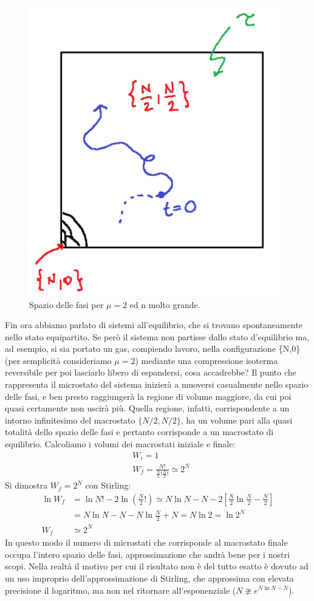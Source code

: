 \documentclass[
10pt, %
a4paper, %
oneside, %
headinclude,footinclude, %
BCOR5mm, %
]{scrartcl}
\begin{document}
\begin{figure}[h!]
	\centering
	\includegraphics[width=0.4\linewidth]{"../images/Spazio delle fasi"}
	\caption{Spazio delle fasi per $\mu = 2$ ed n molto grande.}
	\label{fig:spazio-delle-fasi}
\end{figure}
\FloatBarrier
Fin ora abbiamo parlato di sistemi all'equilibrio, che si trovano spontaneamente nello stato equipartito. Se però il sistema non partisse dallo stato d'equilibrio ma, ad esempio, si sia portato un gas, compiendo lavoro, nella configurazione \{N,0\} (per semplicità consideriamo $\mu=2$) mediante una compressione isoterma reversibile per poi lasciarlo libero di espandersi, cosa accadrebbe? Il punto che rappresenta il microstato del sistema inizierà a muoversi casualmente nello spazio delle fasi, e ben presto raggiungerà la regione di volume maggiore, da cui poi quasi certamente non uscirà più. Quella regione, infatti, corrispondente a un intorno infinitesimo del macrostato \(\{N/2, N/2\}\), ha un volume pari alla quasi totalità dello spazio delle fasi e pertanto corrisponde a un macrostato di equilibrio. Calcoliamo i volumi dei macrostati iniziale e finale:
\begin{align*}
	&W_i = 1\\
	&W_f = \frac{N!}{\frac{N}{2}!\frac{N}{2}!}\simeq2^N
\end{align*}
Si dimostra \(W_f = 2^N\) con Stirling:
\begin{align*}
	\ln W_f &= \ln N! - 2 \ln \left(\frac{N}{2}!\right) \simeq N\ln N - N - 2 \left[\frac{N}{2}\ln\frac{N}{2} - \frac{N}{2}\right]\\
	&=N \ln N - N - N\ln \frac{N}{2} + N = N \ln 2 = \ln 2^N\\
	W_f &\simeq 2^N
\end{align*}
In questo modo il numero di microstati che corrisponde al macrostato finale occupa l'intero spazio delle fasi, approssimazione che andrà bene per i nostri scopi. Nella realtà il motivo per cui il risultato non è del tutto esatto è dovuto ad un uso improprio dell'approssimazione di Stirling, che approssima con elevata precisione il logaritmo, ma non nel ritornare all'esponenziale (\(N \ncong e^{N\ln N - N}\)).\\
\end{document}
